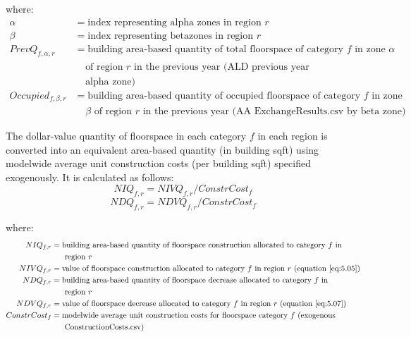 \noindent where:
\begin{align*}
\alpha &= \text{index representing alpha zones in region $r$} \\
\beta &= \text{index representing betazones in region $r$} \\
PrevQ_{f,\alpha,r} &= \text{building area-based quantity of total floorspace of category $f$ in zone $\alpha$} \\
 &~~~~~\text{of region $r$ in the previous year (ALD previous year FloorspaceInventory.csv by} \\
 &~~~~~\text{alpha zone)} \\
Occupied_{f,\beta,r} &= \text{building area-based quantity of occupied floorspace of category $f$ in zone} \\
 &~~~~~\text{$\beta$ of region $r$ in the previous year (AA ExchangeResults.csv by beta zone)}
\end{align*}

The dollar-value quantity of floorspace in each category $f$ in each region is converted into an equivalent area-based quantity (in building sqft) using modelwide average unit construction costs (per building sqft) specified exogenously. It is calculated as follows:
\begin{equation}\label{eq:5.10}  %
NIQ_{f,r} = NIVQ_{f,r} / ConstrCost_f
\end{equation}
\begin{equation}\label{eq:5.11}  %
NDQ_{f,r} = NDVQ_{f,r} / ConstrCost_f
\end{equation}

\noindent where:
\begin{align*}
NIQ_{f,r} &= \text{building area-based quantity of floorspace construction allocated to category $f$ in} \\
 &~~~~~\text{region $r$} \\
NIVQ_{f,r} &= \text{value of floorspace construction allocated to category $f$ in region $r$ (equation \ref{eq:5.05})} \\
NDQ_{f,r} &= \text{building area-based quantity of floorspace decrease allocated to category $f$ in} \\
 &~~~~~\text{region $r$} \\
NDVQ_{f,r} &= \text{value of floorspace decrease allocated to category $f$ in region $r$ (equation \ref{eq:5.07})} \\
ConstrCost_f &= \text{modelwide average unit construction costs for floorspace category $f$ (exogenous} \\
 &~~~~~\text{ConstructionCosts.csv)}
\end{align*}


